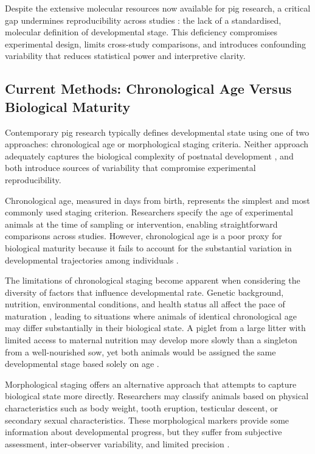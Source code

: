 Despite the extensive molecular resources now available for pig research, a critical gap undermines reproducibility across studies \parencite{baker_1500_2016}: the lack of a standardised, molecular definition of developmental stage. This deficiency compromises experimental design, limits cross-study comparisons, and introduces confounding variability that reduces statistical power and interpretive clarity.

\subsection{Current Methods: Chronological Age Versus Biological Maturity}

Contemporary pig research typically defines developmental state using one of two approaches: chronological age or morphological staging criteria. Neither approach adequately captures the biological complexity of postnatal development \parencite{boeyer_evidence_2020}, and both introduce sources of variability that compromise experimental reproducibility.

Chronological age, measured in days from birth, represents the simplest and most commonly used staging criterion. Researchers specify the age of experimental animals at the time of sampling or intervention, enabling straightforward comparisons across studies. However, chronological age is a poor proxy for biological maturity because it fails to account for the substantial variation in developmental trajectories among individuals \parencite{boeyer_evidence_2020}.

The limitations of chronological staging become apparent when considering the diversity of factors that influence developmental rate. Genetic background, nutrition, environmental conditions, and health status all affect the pace of maturation \parencite{boeyer_evidence_2020}, leading to situations where animals of identical chronological age may differ substantially in their biological state. A piglet from a large litter with limited access to maternal nutrition may develop more slowly than a singleton from a well-nourished sow, yet both animals would be assigned the same developmental stage based solely on age \parencite{yuan_within-litter_2015, hole_does_2018}.

Morphological staging offers an alternative approach that attempts to capture biological state more directly. Researchers may classify animals based on physical characteristics such as body weight, tooth eruption, testicular descent, or secondary sexual characteristics. These morphological markers provide some information about developmental progress, but they suffer from subjective assessment, inter-observer variability, and limited precision \parencite{boeyer_evidence_2020}.

